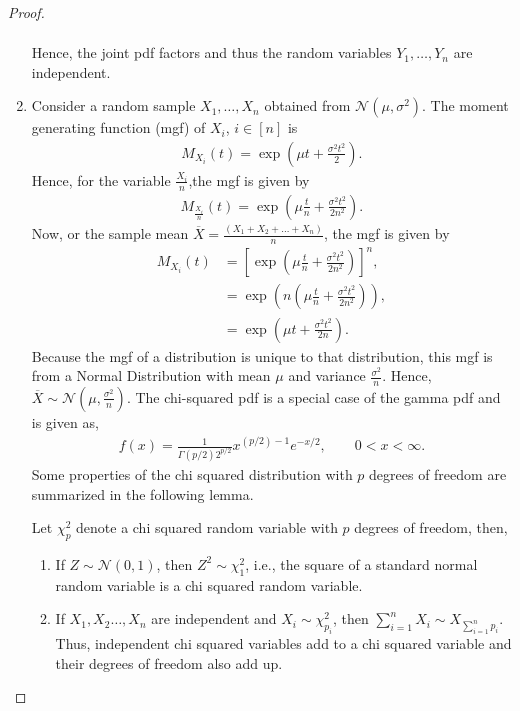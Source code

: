 \documentclass[a4paper,english,12pt]{article}
\begin{document}
\begin{proof}
\begin{enumerate}
\begin{align}
\end{align}
Hence, the joint pdf factors and thus the random variables $Y_1,\dots ,Y_n$ are independent. 
\item Consider a random sample $X_1,\dots ,X_n$ obtained from $\mathcal{N}(\mu,\sigma^2)$. The moment generating function (mgf) of $X_i$, $i\in[n]$ is 
\begin{align}
M_{X_i}(t)=\exp{(\mu t +\frac{\sigma^2 t^2}{2})}.
\end{align}
Hence, for the variable $\frac{X_i}{n}$,the mgf is given by 
\begin{align}
M_{\frac{X_i}{n}}(t)=\exp{(\mu \frac{t}{n} +\frac{\sigma^2 t^2}{2n^2})}.
\end{align}
Now, or the sample mean $\overline{X}=\frac{(X_1+X_2+\dots +X_n)}{n}$, the mgf is given by 
\begin{align}
M_{X_i}(t)&={\left[\exp{(\mu \frac{t}{n} +\frac{\sigma^2 t^2}{2n^2})}\right]}^n, \nonumber \\
&=\exp{(n(\mu \frac{t}{n} +\frac{\sigma^2 t^2}{2n^2}))}, \nonumber \\
&=\exp{(\mu t +\frac{\sigma^2 t^2}{2n})}.
\end{align}
Because the mgf of a distribution is unique to that distribution, this mgf is from a Normal Distribution with mean $\mu$ and variance $\frac{\sigma^2}{n}$. Hence, $\overline{X} \sim \mathcal{N}(\mu,\frac{\sigma^2}{n}).$
The chi-squared pdf is a special case of the gamma pdf and is given as, 
\begin{align}
f(x)=\frac{1}{\Gamma(p/2)2^{p/2}}x^{(p/2)-1}e^{-x/2}, \qquad 0<x<\infty. 
\end{align}
Some properties of the chi squared distribution with $p$ degrees of freedom are summarized in the following lemma. 
\begin{lem} \label{lemma_5.3.2_casella_berger}
Let $\chi _p^2$ denote a chi squared random variable with $p$ degrees of freedom, then, 
\renewcommand{\labelenumi}{\alph{enumi})}
\begin{enumerate}
\item If $Z\sim \mathcal{N}(0,1)$, then $Z^2 \sim \chi_1^2$, i.e., the  square of a standard normal random variable is a chi squared random variable. 
\item If $X_1,X_2\dots , X_n$ are independent and $X_i\sim \chi _{p_i}^2$, then $\sum_{i=1}^nX_i\sim X_{\sum_{i=1}^np_i}$. Thus, independent chi squared variables add to a chi squared variable and their degrees of freedom also add up. 
\end{enumerate}

\end{lem}
\end{enumerate}
\end{proof}
\end{document}
